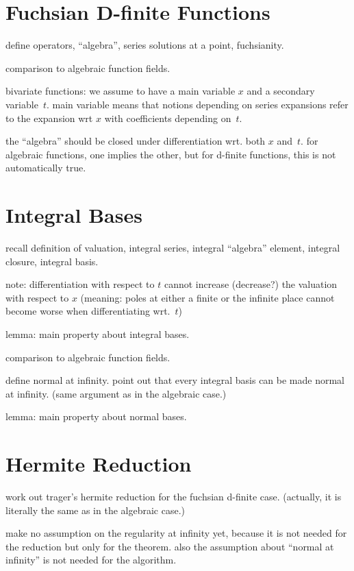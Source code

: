 \documentclass{sig-alternate}
\begin{document}
\section{Fuchsian D-finite Functions}

define operators, ``algebra'', series solutions at a point, fuchsianity.

comparison to algebraic function fields.

bivariate functions: we assume to have a main variable $x$ and a secondary variable~$t$.
main variable means that notions depending on series expansions refer to the expansion
wrt $x$ with coefficients depending on~$t$.

the ``algebra'' should be closed under differentiation wrt. both $x$ and~$t$. for algebraic
functions, one implies the other, but for d-finite functions, this is not automatically true.

\section{Integral Bases}

recall definition of valuation, integral series, integral ``algebra'' element, integral closure, integral basis.

note: differentiation with respect to $t$ cannot increase (decrease?) the valuation with respect to $x$
(meaning: poles at either a finite or the infinite place cannot become worse when differentiating wrt.~$t$)

lemma: main property about integral bases.

comparison to algebraic function fields.

define normal at infinity. point out that every integral basis can be made normal at infinity.
(same argument as in the algebraic case.)

lemma: main property about normal bases. 

\section{Hermite Reduction}

work out trager's hermite reduction for the fuchsian d-finite case. (actually, it is
literally the same as in the algebraic case.)

make no assumption on the regularity at infinity yet, because it is not needed for the
reduction but only for the theorem. also the assumption about ``normal at infinity'' is
not needed for the algorithm.
\end{document}
